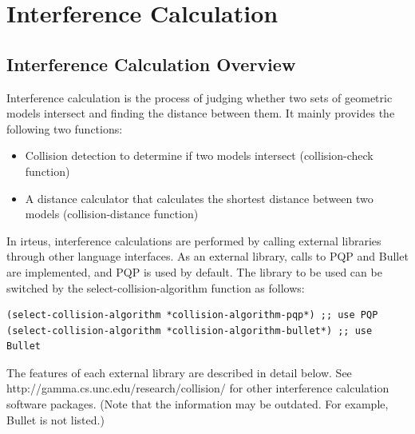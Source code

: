 \section{Interference Calculation}

\subsection{Interference Calculation Overview}

Interference calculation is the process of judging whether two sets of geometric models intersect and finding the distance between them. It mainly provides the following two functions:
\begin{itemize}
  \item Collision detection to determine if two models intersect (collision-check function)
  \item A distance calculator that calculates the shortest distance between two models (collision-distance function)
\end{itemize}

In irteus, interference calculations are performed by calling external libraries through other language interfaces. As an external library, calls to PQP and Bullet are implemented, and PQP is used by default. The library to be used can be switched by the select-collision-algorithm function as follows:
{\baselineskip=10pt
\begin{verbatim}
(select-collision-algorithm *collision-algorithm-pqp*) ;; use PQP
(select-collision-algorithm *collision-algorithm-bullet*) ;; use Bullet
\end{verbatim}
}

The features of each external library are described in detail below. See http://gamma.cs.unc.edu/research/collision/ for other interference calculation software packages. (Note that the information may be outdated. For example, Bullet is not listed.)



